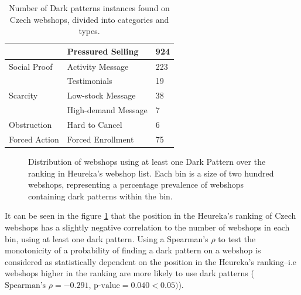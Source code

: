 \begin{table}[h!]
\begin{tabular}{ll|l}
                                                        & Pressured Selling                  & 924                                       \\ \hline
                Social Proof                          & Activity Message                   & 223                                       \\
                                                        & Testimonials                       & 19                                        \\ \hline
                Scarcity                              & Low-stock Message                  & 38                                        \\
                                                        & High-demand Message                & 7                                         \\ \hline
                Obstruction                           & Hard to Cancel                     & 6                                         \\ \hline
                Forced Action                         & Forced Enrollment                  & 75                                        \\ \hline                                       
                \end{tabular}
            \egroup
        \caption{Number of Dark patterns instances found on Czech webshops, divided into categories and types.}
        \label{table:summary-dark-patterns}
    \end{table}
    
    \begin{figure}
        \begin{center}
            
        \end{center}
        \caption{Distribution of webshops using at least one Dark Pattern over the ranking in Heureka's webshop list. Each bin is a size of two hundred webshops, representing a percentage prevalence of webshops containing dark patterns within the bin.}
        \label{fig:dp-percentage}
    \end{figure}
    
    It can be seen in the figure \ref{fig:dp-percentage} that the position in the Heureka's ranking of Czech webshops has a slightly negative correlation to the number of webshops in each bin, using at least one dark pattern. Using a Spearman's $\rho$ to test the monotonicity of a probability of finding a dark pattern on a webshop is considered as statistically dependent on the position in the Heureka's ranking--i.e webshops higher in the ranking are more likely to use dark patterns ($\text{Spearman's }\rho=-0.291$, $\text{p-value}=0.040 < 0.05)$).
    
